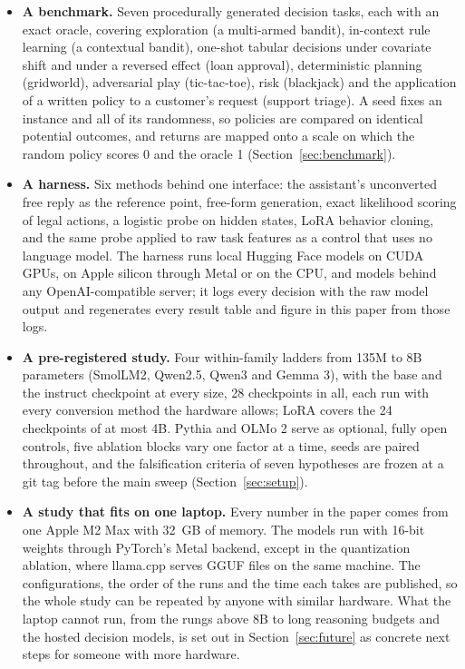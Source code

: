 \begin{itemize}
  \item \textbf{A benchmark.} Seven procedurally generated decision tasks, each with an exact oracle, covering exploration (a multi-armed bandit), in-context rule learning (a contextual bandit), one-shot tabular decisions under covariate shift and under a reversed effect (loan approval), deterministic planning (gridworld), adversarial play (tic-tac-toe), risk (blackjack) and the application of a written policy to a customer's request (support triage). A seed fixes an instance and all of its randomness, so policies are compared on identical potential outcomes, and returns are mapped onto a scale on which the random policy scores 0 and the oracle 1 (Section~\ref{sec:benchmark}).
  \item \textbf{A harness.} Six methods behind one interface: the assistant's unconverted free reply as the reference point, free-form generation, exact likelihood scoring of legal actions, a logistic probe on hidden states, LoRA behavior cloning, and the same probe applied to raw task features as a control that uses no language model. The harness runs local Hugging Face models on CUDA GPUs, on Apple silicon through Metal or on the CPU, and models behind any OpenAI-compatible server; it logs every decision with the raw model output and regenerates every result table and figure in this paper from those logs.
  \item \textbf{A pre-registered study.} Four within-family ladders from 135M to 8B parameters (SmolLM2, Qwen2.5, Qwen3 and Gemma 3), with the base and the instruct checkpoint at every size, 28 checkpoints in all, each run with every conversion method the hardware allows; LoRA covers the 24 checkpoints of at most 4B. Pythia and OLMo 2 serve as optional, fully open controls, five ablation blocks vary one factor at a time, seeds are paired throughout, and the falsification criteria of seven hypotheses are frozen at a git tag before the main sweep (Section~\ref{sec:setup}).
  \item \textbf{A study that fits on one laptop.} Every number in the paper comes from one Apple M2 Max with 32~GB of memory. The models run with 16-bit weights through PyTorch's Metal backend, except in the quantization ablation, where llama.cpp serves GGUF files on the same machine. The configurations, the order of the runs and the time each takes are published, so the whole study can be repeated by anyone with similar hardware. What the laptop cannot run, from the rungs above 8B to long reasoning budgets and the hosted decision models, is set out in Section~\ref{sec:future} as concrete next steps for someone with more hardware.

\end{itemize}
